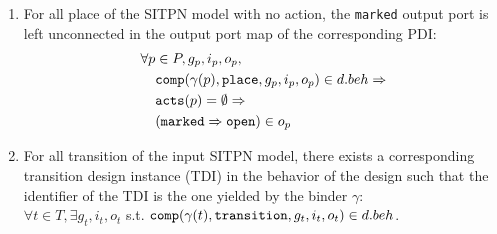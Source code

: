 \begin{definition}
\begin{enumerate}
    
  \item For all place of the SITPN model with no action, the
    \texttt{marked} output port is left unconnected in the output port
    map of the corresponding PDI:
    \begin{equation*}
      \begin{aligned}
        \forall{}p&\in{}P,g_p,i_p,o_p, \\
                  & \mathtt{comp}(\gamma(p),\mathtt{place},g_p,i_p,o_p)\in{}d.beh\Rightarrow \\
                  & \mathtt{acts}(p)=\emptyset\Rightarrow \\
                  & (\mathtt{marked}\Rightarrow{}\mathtt{open})\in{}o_p \\
      \end{aligned}
    \end{equation*}

  \item For all transition of the input SITPN model, there exists a
    corresponding transition design instance (TDI) in the behavior of
    the \hvhdl{} design such that the identifier of the TDI is the one
    yielded
    by the binder $\gamma$:\\
    $\forall{}t\in{}T,\exists{}g_t,i_t,o_t$ s.t. $\mathtt{comp}(\gamma(t),\mathtt{transition},g_t,i_t,o_t)\in{}d.beh$.
    

\end{enumerate}
\end{definition}
